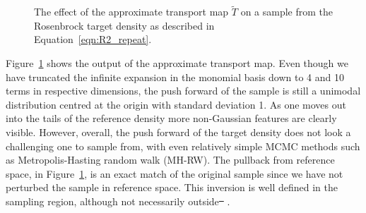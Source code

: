 \documentclass[final]{siamltex}
\providecommand{\DIFadd}[1]{{\protect\color{blue}\uwave{#1}}} %
\providecommand{\DIFdel}[1]{{\protect\color{red}\sout{#1}}}                      %
\providecommand{\DIFaddbegin}{} %
\providecommand{\DIFaddend}{} %
\providecommand{\DIFdelbegin}{} %
\providecommand{\DIFdelend}{} %
\newcommand{\DIFscaledelfig}{0.5}
\newlength{\DIFdelgraphicswidth} %
\newlength{\DIFdelgraphicsheight} %
\newcommand{\DIFaddincludegraphics}[2][]{{\color{blue}\fbox{\DIFOincludegraphics[#1]{#2}}}} %
\newcommand{\DIFdelincludegraphics}[2][]{%
\sbox{\DIFdelgraphicsbox}{\DIFOincludegraphics[#1]{#2}}%
\settoboxwidth{\DIFdelgraphicswidth}{\DIFdelgraphicsbox} %
\settoboxtotalheight{\DIFdelgraphicsheight}{\DIFdelgraphicsbox} %
\scalebox{\DIFscaledelfig}{%
\parbox[b]{\DIFdelgraphicswidth}{\usebox{\DIFdelgraphicsbox}\\[-\baselineskip] \rule{\DIFdelgraphicswidth}{0em}}\llap{\resizebox{\DIFdelgraphicswidth}{\DIFdelgraphicsheight}{%
\setlength{\unitlength}{\DIFdelgraphicswidth}%
\begin{picture}(1,1)%
\thicklines\linethickness{2pt} %
{\color[rgb]{1,0,0}\put(0,0){\framebox(1,1){}}}%
{\color[rgb]{1,0,0}\put(0,0){\line( 1,1){1}}}%
{\color[rgb]{1,0,0}\put(0,1){\line(1,-1){1}}}%
\end{picture}%
}\hspace*{3pt}}} %
} %
\DeclareRobustCommand{\DIFaddbegin}{\DIFOaddbegin \let\includegraphics\DIFaddincludegraphics} %
\DeclareRobustCommand{\DIFaddend}{\DIFOaddend \let\includegraphics\DIFOincludegraphics} %
\DeclareRobustCommand{\DIFdelbegin}{\DIFOdelbegin \let\includegraphics\DIFdelincludegraphics} %
\DeclareRobustCommand{\DIFdelend}{\DIFOaddend \let\includegraphics\DIFOincludegraphics} %
\begin{document}
\begin{figure}[htpb]
\centering
{}\quad
{}\quad
{}
\caption{The effect of the approximate transport map $\tilde{T}$ on a
  sample from the Rosenbrock target density as described in Equation~\eqref{eqn:R2_repeat}.}
\label{fig:R2_transport}
\end{figure}

Figure~\ref{fig:R2_transport} shows the output of the approximate
transport map. Even though we have truncated the infinite expansion in
the monomial basis down to 4 and 10 terms in respective dimensions,
the push forward of the sample is still a unimodal distribution
centred at the origin with standard deviation 1. As one moves out into
the tails of the reference density more non-Gaussian features are
clearly visible. However, overall, the push forward of the target
density does not look a challenging one to sample from, with even
relatively simple MCMC methods such as Metropolis-Hasting random walk (MH-RW). The pullback from
reference space, in Figure~\ref{fig:R2_transport}, is an exact match
of the original sample since we have not perturbed the sample in
reference space. This inversion is well defined in the sampling
region, although not necessarily outside\DIFdelbegin \DIFdel{\mbox{%
\cite{parno2014transport}}\hspace{0pt}%
}\DIFdelend \DIFaddbegin \DIFadd{\mbox{%
\cite{parno2018transport}}\hspace{0pt}%
}\DIFaddend .
\end{document}
